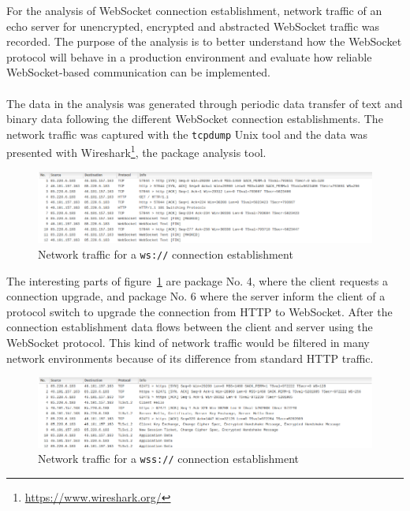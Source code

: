 For the analysis of WebSocket connection establishment, network traffic of an echo server for unencrypted, encrypted and abstracted WebSocket traffic was recorded. The purpose of the analysis is to better understand how the WebSocket protocol will behave in a production environment and evaluate how reliable WebSocket-based communication can be implemented.
\\ \\
The data in the analysis was generated through periodic data transfer of text and binary data following the different WebSocket connection establishments. The network traffic was captured with the \texttt{tcpdump} Unix tool and the data was presented with Wireshark\footnote{\url{https://www.wireshark.org/}}, the package analysis tool.
\\
\begin{figure}[h!]
	\centering
	\includegraphics[width=1\textwidth]{images/ws_dump}
	\caption{Network traffic for a \texttt{ws://} connection establishment}
	\label{fig:wsTraffic}
\end{figure}

\noindent
The interesting parts of figure~\ref{fig:wsTraffic} are package No. 4, where the client requests a connection upgrade, and package No. 6 where the server inform the client of a protocol switch to upgrade the connection from HTTP to WebSocket. After the connection establishment data flows between the client and server using the WebSocket protocol. This kind of network traffic would be filtered in many network environments because of its difference from standard HTTP traffic.
\\
\begin{figure}[h!]
	\centering
	\includegraphics[width=1\textwidth]{images/wss_dump}
	\caption{Network traffic for a \texttt{wss://} connection establishment}
	\label{fig:wssTraffic}
\end{figure}

